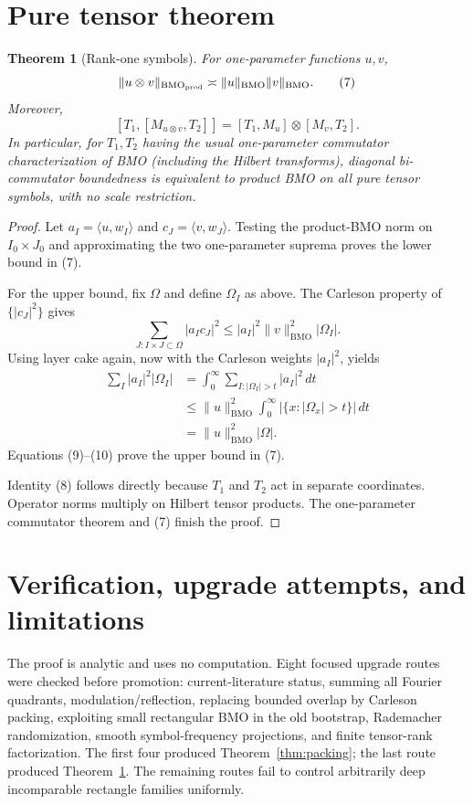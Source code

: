 \documentclass[11pt]{article}
\newtheorem{theorem}{Theorem}
\newcommand{\BMO}{\mathrm{BMO}}
\begin{document}
\section*{Pure tensor theorem}

\begin{theorem}[Rank-one symbols]\label{thm:tensor}
For one-parameter functions $u,v$,
\[
 \|u\otimes v\|_{\BMO_{\rm prod}}
 \asymp \|u\|_{\BMO}\|v\|_{\BMO}.                    \tag{7}
\]
Moreover,
\[
 [T_1,[M_{u\otimes v},T_2]]
   =[T_1,M_u]\otimes[M_v,T_2].                         \tag{8}
\]
In particular, for $T_1,T_2$ having the usual one-parameter commutator
characterization of BMO (including the Hilbert transforms), diagonal
bi-commutator boundedness is equivalent to product BMO on all pure tensor
symbols, with no scale restriction.
\end{theorem}

\begin{proof}
Let $a_I=\langle u,w_I\rangle$ and $c_J=\langle v,w_J\rangle$.
Testing the product-BMO norm on $I_0\times J_0$ and approximating the two
one-parameter suprema proves the lower bound in (7).

For the upper bound, fix $\Omega$ and define $\Omega_I$ as above.  The
Carleson property of $\{|c_J|^2\}$ gives
\[
 \sum_{J:I\times J\subset\Omega}|a_Ic_J|^2
 \le |a_I|^2\|v\|_{\BMO}^2|\Omega_I|.                 \tag{9}
\]
Using layer cake again, now with the Carleson weights $|a_I|^2$, yields
\begin{align*}
 \sum_I|a_I|^2|\Omega_I|
 &=\int_0^\infty\sum_{I:|\Omega_I|>t}|a_I|^2\,dt\\
 &\le\|u\|_{\BMO}^2
   \int_0^\infty|\{x:|\Omega_x|>t\}|\,dt\\
 &=\|u\|_{\BMO}^2|\Omega|.                           \tag{10}
\end{align*}
Equations (9)--(10) prove the upper bound in (7).

Identity (8) follows directly because $T_1$ and $T_2$ act in separate
coordinates.  Operator norms multiply on Hilbert tensor products.  The
one-parameter commutator theorem \cite{CRW} and (7) finish the proof.
\end{proof}

\section*{Verification, upgrade attempts, and limitations}

The proof is analytic and uses no computation.  Eight focused upgrade routes
were checked before promotion: current-literature status, summing all Fourier
quadrants, modulation/reflection, replacing bounded overlap by Carleson
packing, exploiting small rectangular BMO in the old bootstrap, Rademacher
randomization, smooth symbol-frequency projections, and finite tensor-rank
factorization.  The first four produced Theorem~\ref{thm:packing}; the last
route produced Theorem~\ref{thm:tensor}.  The remaining routes fail to control
arbitrarily deep incomparable rectangle families uniformly.
\end{document}
